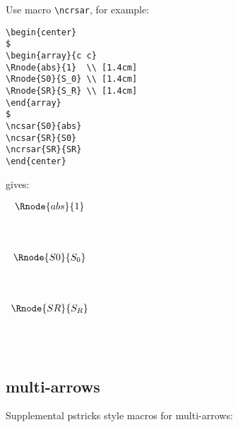 \documentclass[10pt,a4paper]{article}
\begin{document}
\noindent
Use macro \verb'\ncrsar', for example:
\begin{verbatim}
\begin{center}
$
\begin{array}{c c}
\Rnode{abs}{1}  \\ [1.4cm]
\Rnode{S0}{S_0} \\ [1.4cm]
\Rnode{SR}{S_R} \\ [1.4cm]
\end{array}
$
\ncsar{S0}{abs}
\ncsar{SR}{S0}
\ncrsar{SR}{SR}
\end{center}
\end{verbatim}
gives:

\begin{center}
$
\begin{array}{c c}
\Rnode{abs}{1}  \\ [1.4cm]
\Rnode{S0}{S_0} \\ [1.4cm]
\Rnode{SR}{S_R} \\ [1.4cm]
\end{array}
$
\end{center}


\subsection {multi-arrows}

\noindent Supplemental pstricks style macros for multi-arrows:
\end{document}

